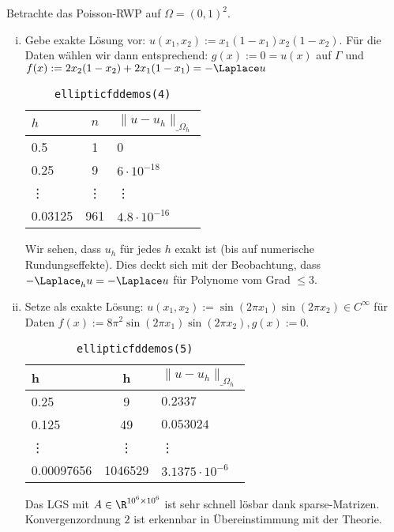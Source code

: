 \begin{ex*}
	Betrachte das Poisson-RWP auf $\Omega = (0,1)^2$.
	\begin{enumerate}[i)]
		\item
			Gebe exakte Lösung vor: $u(x_1, x_2) := x_1(1-x_1)x_2(1-x_2)$.
			Für die Daten wählen wir dann entsprechend: $g(x) := 0 = u(x)$ auf $\Gamma$ und $f(x) := 2x_2(1-x_2) + 2x_1(1-x_1) = -\Laplace u$
			\begin{table}[ht]
				\centering
				\begin{tabular}{l|c|l}
					$h$ & $n$ & $\|u - u_h\|_{\_\Omega_h}$ \\ \hline
					0.5 & 1 & 0 \\
					0.25 & 9 & $6 \cdot 10^{-18}$ \\
					\vdots & \vdots & \vdots \\
					0.03125 & 961 & $4.8 \cdot 10^{-16}$
				\end{tabular}
				\caption{\texttt{elliptic\textunderscore fd\textunderscore demos(4)}}
			\end{table}
			Wir sehen, dass $u_h$ für jedes $h$ exakt ist (bis auf numerische Rundungseffekte).
			Dies deckt sich mit der Beobachtung, dass $-\Laplace_h u = - \Laplace u$ für Polynome vom Grad $\le 3$.
		\item
			Setze als exakte Lösung: $u(x_1, x_2) := \sin(2\pi x_1) \sin(2\pi x_2) \in C^\infty$ für Daten $f(x) := 8\pi^2 \sin(2\pi x_1) \sin(2\pi x_2), g(x) := 0$.
			\begin{table}[ht]
				\centering
				\begin{tabular}{l|cl}
					h & h & $\|u - u_h\|_{\_\Omega_h}$ \\ \hline
					0.25 & 9 & $0.2337$ \\
					0.125 & 49 & $0.053024$ \\
					\vdots & \vdots & \vdots \\
					0.00097656 & 1046529 & $3.1375 \cdot 10^{-6}$
				\end{tabular}
				\caption{\texttt{elliptic\textunderscore fd\textunderscore demos(5)}}
			\end{table}

			Das LGS mit $A \in \R^{10^6 \times 10^6}$ ist sehr schnell lösbar dank sparse-Matrizen.
			Konvergenzordnung $2$ ist erkennbar in Übereinstimmung mit der Theorie.
	\end{enumerate}
\end{ex*}

